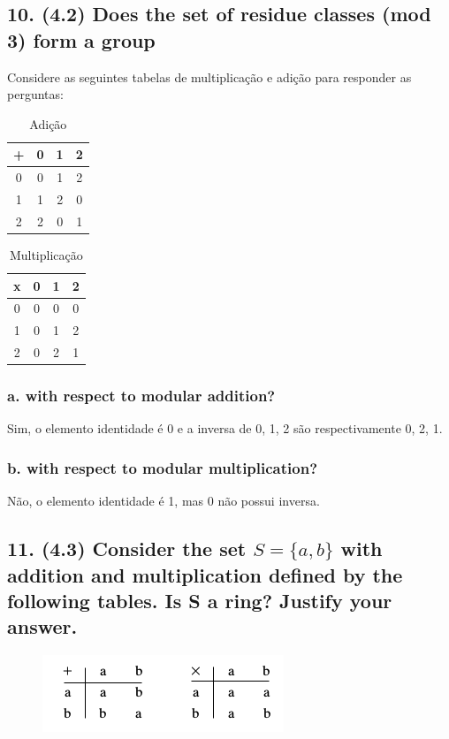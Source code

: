\documentclass[fleqn, 12pt]{article}
\begin{document}
\subsection*{10. (4.2) Does the set of residue classes (mod 3) form a group}

    Considere as seguintes tabelas de multiplicação e adição para responder as perguntas:

    \begin{table}[h]
      \centering
      \caption{Adição}
      \begin{tabular}{|c|c|c|c|}
      \hline
      + & 0 & 1 & 2  \\ \hline
      0 & 0 & 1 & 2  \\ \hline
      1 & 1 & 2 & 0  \\ \hline
      2 & 2 & 0 & 1  \\ \hline
      \end{tabular}
    \end{table}

    \begin{table}[h]
      \centering
      \caption{Multiplicação}
      \begin{tabular}{|c|c|c|c|}
      \hline
      x & 0 & 1 & 2  \\ \hline
      0 & 0 & 0 & 0  \\ \hline
      1 & 0 & 1 & 2  \\ \hline
      2 & 0 & 2 & 1  \\ \hline
      \end{tabular}
    \end{table}

  \subsubsection*{a. with respect to modular addition?}

    Sim, o elemento identidade é 0 e a inversa de 0, 1, 2 são respectivamente 0,
    2, 1.

  \subsubsection*{b. with respect to modular multiplication?}

    Não, o elemento identidade é 1, mas 0 não possui inversa.

\subsection*{11. (4.3) Consider the set $S = \lbrace a, b \rbrace$ with addition and multiplication defined by the following tables. Is S a ring? Justify your answer.}
  \begin{figure}[h]
    \centering
    \includegraphics{quatro_tres}
  \end{figure}
\end{document}
